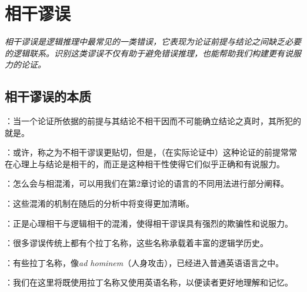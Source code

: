 \section{相干谬误}

\begin{logicbox}[title=引言]
\textit{相干谬误是逻辑推理中最常见的一类错误，它表现为论证前提与结论之间缺乏必要的逻辑联系。识别这类谬误不仅有助于避免错误推理，也能帮助我们构建更有说服力的论证。}
\end{logicbox}

\subsection{相干谬误的本质}

\begin{theorembox}[title=相干谬误的定义]
：当一个论证所依据的前提与其结论不相干因而不可能确立结论之真时，其所犯的就是。

：或许，称之为不相干谬误更贴切，但是，（在实际论证中）这种论证的前提常常在心理上与结论是相干的，而正是这种相干性使得它们似乎正确和有说服力。
\end{theorembox}

\begin{theorembox}[title=心理相干与逻辑相干的混淆]
：怎么会与相混淆，可以用我们在第2章讨论的语言的不同用法进行部分阐释。

：这些混淆的机制在随后的分析中将变得更加清晰。

：正是心理相干与逻辑相干的混淆，使得相干谬误具有强烈的欺骗性和说服力。
\end{theorembox}

\begin{theorembox}[title=谬误的命名传统]
：很多谬误传统上都有个拉丁名称，这些名称承载着丰富的逻辑学历史。

：有些拉丁名称，像\textit{ad hominem}（人身攻击），已经进入普通英语语言之中。

：我们在这里将既使用拉丁名称又使用英语名称，以便读者更好地理解和记忆。
\end{theorembox}

